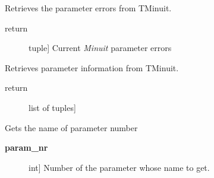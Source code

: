 \documentclass[a4paper,10pt,english]{sphinxmanual}
\begin{document}
\begin{fulllineitems}
\begin{fulllineitems}
\begin{description}
\begin{description}
\begin{itemize}
\end{itemize}

\end{description}

\end{description}

\end{fulllineitems}


\begin{fulllineitems}
\label{index:kafe.minuit.Minuit.get_parameter_errors}
Retrieves the parameter errors from TMinuit.
\begin{description}
\item[{return}] \leavevmode{[}tuple{]}
Current \emph{Minuit} parameter errors

\end{description}

\end{fulllineitems}


\begin{fulllineitems}
\label{index:kafe.minuit.Minuit.get_parameter_info}
Retrieves parameter information from TMinuit.
\begin{description}
\item[{return}] \leavevmode{[}list of tuples{]}

\end{description}

\end{fulllineitems}


\begin{fulllineitems}
\label{index:kafe.minuit.Minuit.get_parameter_name}
Gets the name of parameter number 
\begin{description}
\item[{\textbf{param\_nr}}] \leavevmode{[}int{]}
Number of the parameter whose name to get.

\end{description}


\end{fulllineitems}
\end{fulllineitems}
\end{document}
